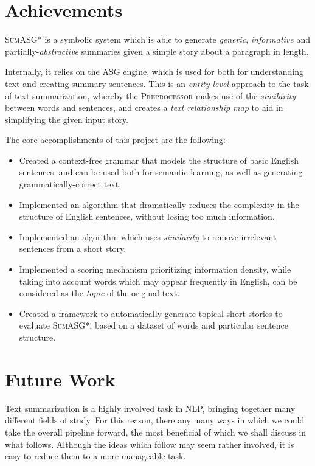 \section{Achievements}

\textsc{SumASG*} is a symbolic system which is able to generate \textit{generic}, \textit{informative} and partially-\textit{abstractive} summaries given a simple story about a paragraph in length.

Internally, it relies on the ASG engine, which is used for both for understanding text and creating summary sentences. This is an \textit{entity level} approach to the task of text summarization, whereby the \textsc{Preprocessor} makes use of the \textit{similarity} between words and sentences, and creates a \textit{text relationship map} to aid in simplifying the given input story.

The core accomplishments of this project are the following:

\begin{itemize}
\item Created a context-free grammar that models the structure of basic English sentences, and can be used both for semantic learning, as well as generating grammatically-correct text.
\item Implemented an algorithm that dramatically reduces the complexity in the structure of English sentences, without losing too much information.
\item Implemented an algorithm which uses \textit{similarity} to remove irrelevant sentences from a short story.
\item Implemented a scoring mechanism prioritizing information density, while taking into account words which may appear frequently in English, can be considered as the \textit{topic} of the original text.
\item Created a framework to automatically generate topical short stories to evaluate \textsc{SumASG*}, based on a dataset of words and particular sentence structure.
\end{itemize}

\section{Future Work}

Text summarization is a highly involved task in NLP, bringing together many different fields of study. For this reason, there any many ways in which we could take the overall pipeline forward, the most beneficial of which we shall discuss in what follows. Although the ideas which follow may seem rather involved, it is easy to reduce them to a more manageable task.

